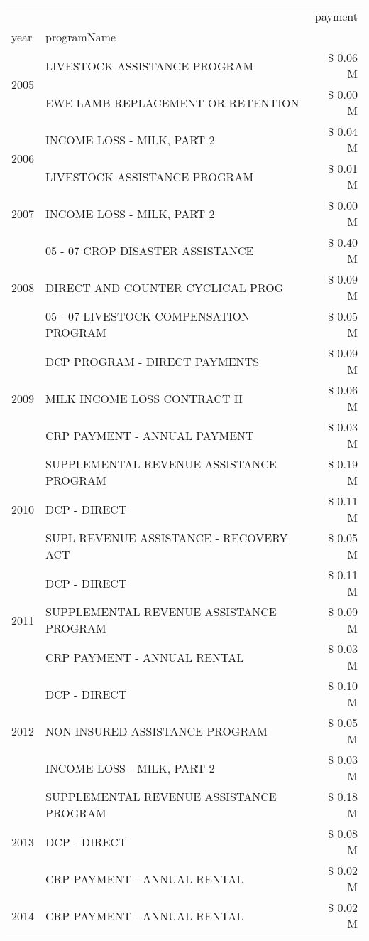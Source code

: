\begin{tabular}{llr}
\toprule
 &  & payment \\
year & programName &  \\
\midrule
\multirow[t]{2}{*}{2005} & LIVESTOCK ASSISTANCE PROGRAM & \$ 0.06 M \\
 & EWE LAMB REPLACEMENT OR RETENTION & \$ 0.00 M \\
\cline{1-3}
\multirow[t]{2}{*}{2006} & INCOME LOSS - MILK, PART 2 & \$ 0.04 M \\
 & LIVESTOCK ASSISTANCE PROGRAM & \$ 0.01 M \\
\cline{1-3}
2007 & INCOME LOSS - MILK, PART 2 & \$ 0.00 M \\
\cline{1-3}
\multirow[t]{3}{*}{2008} & 05 - 07 CROP DISASTER ASSISTANCE & \$ 0.40 M \\
 & DIRECT AND COUNTER CYCLICAL PROG & \$ 0.09 M \\
 & 05 - 07 LIVESTOCK COMPENSATION PROGRAM & \$ 0.05 M \\
\cline{1-3}
\multirow[t]{3}{*}{2009} & DCP PROGRAM - DIRECT PAYMENTS & \$ 0.09 M \\
 & MILK INCOME LOSS CONTRACT II & \$ 0.06 M \\
 & CRP PAYMENT - ANNUAL PAYMENT & \$ 0.03 M \\
\cline{1-3}
\multirow[t]{3}{*}{2010} & SUPPLEMENTAL REVENUE ASSISTANCE PROGRAM & \$ 0.19 M \\
 & DCP - DIRECT & \$ 0.11 M \\
 & SUPL REVENUE ASSISTANCE - RECOVERY ACT & \$ 0.05 M \\
\cline{1-3}
\multirow[t]{3}{*}{2011} & DCP - DIRECT & \$ 0.11 M \\
 & SUPPLEMENTAL REVENUE ASSISTANCE PROGRAM & \$ 0.09 M \\
 & CRP PAYMENT - ANNUAL RENTAL & \$ 0.03 M \\
\cline{1-3}
\multirow[t]{3}{*}{2012} & DCP - DIRECT & \$ 0.10 M \\
 & NON-INSURED ASSISTANCE PROGRAM & \$ 0.05 M \\
 & INCOME LOSS - MILK, PART 2 & \$ 0.03 M \\
\cline{1-3}
\multirow[t]{3}{*}{2013} & SUPPLEMENTAL REVENUE ASSISTANCE PROGRAM & \$ 0.18 M \\
 & DCP - DIRECT & \$ 0.08 M \\
 & CRP PAYMENT - ANNUAL RENTAL & \$ 0.02 M \\
\cline{1-3}
\multirow[t]{3}{*}{2014} & CRP PAYMENT - ANNUAL RENTAL & \$ 0.02 M \\

\end{tabular}
